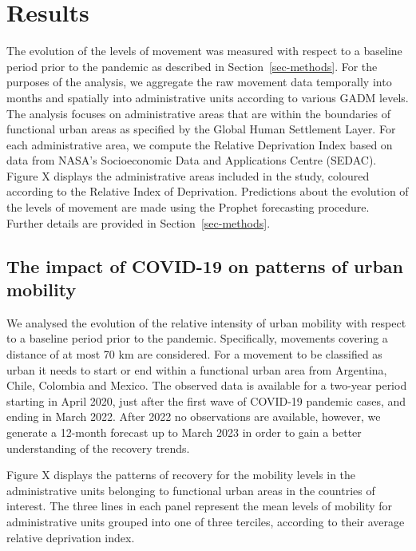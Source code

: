 \documentclass[
  11pt,
]{article}
\begin{document}
\hypertarget{sec-results}{%
\section{Results}\label{sec-results}}

The evolution of the levels of movement was measured with respect to a
baseline period prior to the pandemic as described in
Section~\ref{sec-methods}. For the purposes of the analysis, we
aggregate the raw movement data temporally into months and spatially
into administrative units according to various GADM levels. The analysis
focuses on administrative areas that are within the boundaries of
functional urban areas as specified by the Global Human Settlement
Layer. For each administrative area, we compute the Relative Deprivation
Index based on data from NASA's Socioeconomic Data and Applications
Centre (SEDAC). Figure X displays the administrative areas included in
the study, coloured according to the Relative Index of Deprivation.
Predictions about the evolution of the levels of movement are made using
the Prophet forecasting procedure. Further details are provided in
Section~\ref{sec-methods}.

\hypertarget{the-impact-of-covid-19-on-patterns-of-urban-mobility}{%
\subsection{The impact of COVID-19 on patterns of urban
mobility}\label{the-impact-of-covid-19-on-patterns-of-urban-mobility}}

We analysed the evolution of the relative intensity of urban mobility
with respect to a baseline period prior to the pandemic. Specifically,
movements covering a distance of at most 70 km are considered. For a
movement to be classified as urban it needs to start or end within a
functional urban area from Argentina, Chile, Colombia and Mexico. The
observed data is available for a two-year period starting in April 2020,
just after the first wave of COVID-19 pandemic cases, and ending in
March 2022. After 2022 no observations are available, however, we
generate a 12-month forecast up to March 2023 in order to gain a better
understanding of the recovery trends.

Figure X displays the patterns of recovery for the mobility levels in
the administrative units belonging to functional urban areas in the
countries of interest. The three lines in each panel represent the mean
levels of mobility for administrative units grouped into one of three
terciles, according to their average relative deprivation index.
\end{document}
